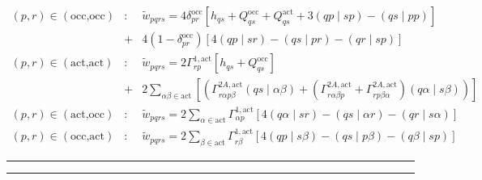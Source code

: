 \documentclass[11pt,a4paper]{article}
\begin{document}
\begin{eqnarray}
(p,r) \in (\text{occ,occ}) & : & \widetilde{w}_{pqrs} = 4 \delta_{pr}^{\text{occ}} \left[ h_{qs} + Q^{\text{occ}}_{qs} + Q^{\text{act}}_{qs} + 3 (qp \mid sp) - (qs \mid pp) \right] \nonumber \\
      & + & 4 ( 1 - \delta_{pr}^{\text{occ}} ) \left[ 4 (qp \mid sr) - ( qs \mid pr ) - ( qr \mid sp ) \right] \\
(p,r) \in (\text{act,act}) & : & \widetilde{w}_{pqrs} = 2 \Gamma^{1,\text{act}}_{rp} \left[ h_{qs} + Q^{\text{occ}}_{qs} \right] \nonumber \\
      & + & 2 \sum\limits_{\alpha\beta \in \text{act}} \left[ \left( \Gamma^{2A,\text{act}}_{r \alpha p \beta} (qs \mid \alpha \beta ) + \left( \Gamma^{2A,\text{act}}_{r \alpha \beta p} + \Gamma^{2A,\text{act}}_{r p \beta \alpha} \right) (q \alpha \mid s \beta ) \right) \right] \\
(p,r) \in (\text{act,occ}) & : & \widetilde{w}_{pqrs} = 2 \sum\limits_{\alpha \in \text{act}} \Gamma^{1,\text{act}}_{\alpha p} \left[ 4 (q \alpha \mid s r) - (qs \mid \alpha r) - (qr \mid s \alpha) \right] \\
(p,r) \in (\text{occ,act}) & : & \widetilde{w}_{pqrs} = 2 \sum\limits_{\beta \in \text{act}} \Gamma^{1,\text{act}}_{r \beta} \left[ 4 (q p \mid s \beta) -  (qs \mid p \beta) - (q \beta \mid sp) \right]
\end{eqnarray}

\hrule
\hrule
\end{document}
